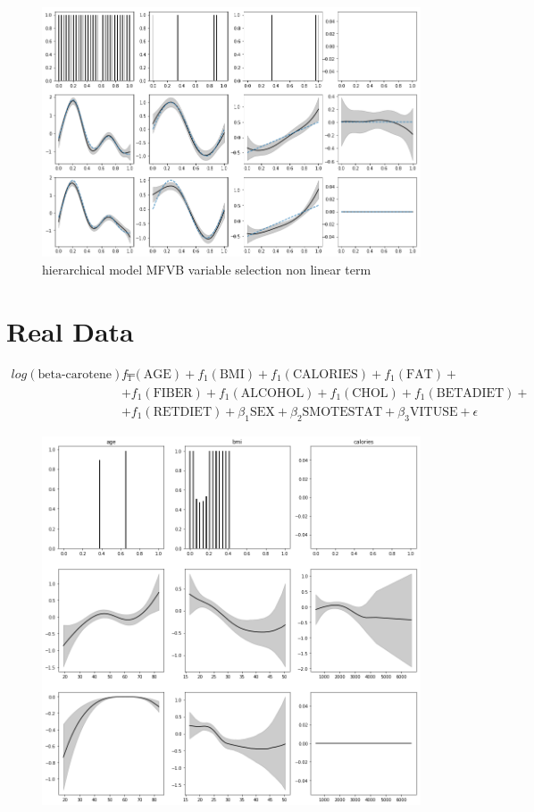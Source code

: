 \documentclass[11pt]{article}
\begin{document}
	
	
	
	
	\begin{figure}[h]
		\centering
		\includegraphics[width=1\linewidth]{mfvb_w_vs_nonlin_hmodel}
		\caption{hierarchical model MFVB variable selection non linear term}
		\label{fig:mfvbwvsnonlin}
	\end{figure}
	

	
	
	
	
	
\section{Real Data}
	
	\begin{align*}
	log(\text{beta-carotene}) =& f_1(\text{AGE}) + f_1(\text{BMI}) + f_1(\text{CALORIES}) + f_1(\text{FAT}) + \\
	& + f_1(\text{FIBER}) + f_1(\text{ALCOHOL}) + f_1(\text{CHOL}) + f_1(\text{BETADIET}) + \\
	& + f_1(\text{RETDIET}) + \beta_1\text{SEX} + \beta_2\text{SMOTESTAT}+ \beta_3\text{VITUSE} + \epsilon
	\end{align*}
	
	
	\begin{figure}[h]
		\centering
		\includegraphics[width=1\linewidth]{../0829/part1}
		\caption{}
		\label{fig:part1}
	\end{figure}
	
	
\end{document}
